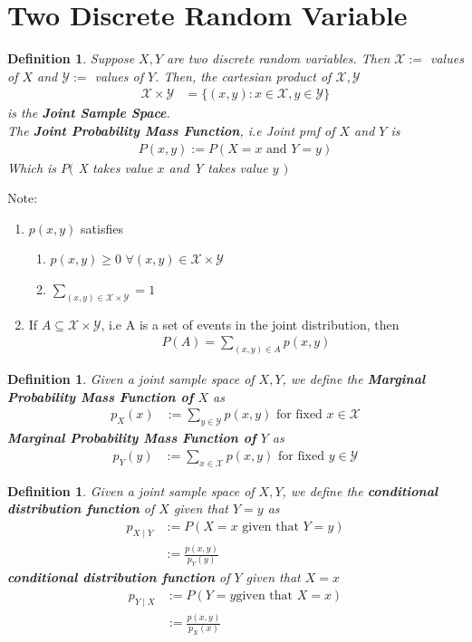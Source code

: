 \documentclass[11pt,oneside]{book}
\theoremstyle{newStyle}
\newtheorem{defn}[thm]{Definition}
\newcommand{\note}{\color{red}Note: \color{black}}
\begin{document}
\section[Two Discrete Random Variable]{Two Discrete Random Variable}
\begin{defn}
Suppose $X,Y$ are two discrete random variables. Then $\mathcal{X}:=$ values of $X$ and $\mathcal{Y}:=$ values of $Y$. Then, the cartesian product of $\mathcal{X},\mathcal{Y}$\begin{align*}
\mathcal{X}\times \mathcal{Y}&=\{(x,y):x\in \mathcal{X},y\in \mathcal{Y}\}
\end{align*}
is the \textbf{Joint Sample Space}.\\
The \textbf{Joint Probability Mass Function}, i.e Joint pmf of $X$ and $Y$ is \begin{align*}
P(x,y):=P(X=x \text{ and }Y=y)
\end{align*}
Which is $P($ X takes value $x$ and Y takes value $y$ $)$
\end{defn}
\note \begin{enumerate}
\item $p(x,y)$ satisfies \begin{enumerate}
\item $p(x,y)\geq 0$ $\forall(x,y)\in \mathcal{X}\times \mathcal{Y}$
\item $\sum_{(x,y)\in \mathcal{X}\times \mathcal{Y}}=1$
\end{enumerate}
\item If $A\subseteq \mathcal{X}\times \mathcal{Y}$, i.e A is a set of events in the joint distribution, then \begin{align*}
P(A)=\sum_{(x,y)\in A}p(x,y)
\end{align*}
\end{enumerate}
\begin{defn}
Given a joint sample space of $X,Y$, we define the \textbf{Marginal Probability Mass Function of }$X$ as \begin{align*}
p_X(x)&:=\sum_{y\in \mathcal{Y}}p(x,y) \text{ for fixed }x\in \mathcal{X}
\end{align*}
\textbf{Marginal Probability Mass Function of }$Y$ as \begin{align*}
p_Y(y)&:=\sum_{x\in \mathcal{X}}p(x,y) \text{ for fixed }y\in \mathcal{Y}
\end{align*}
\end{defn}
\begin{defn}
Given a joint sample space of $X,Y$, we define the \textbf{conditional distribution function} of $X$ given that $Y=y$ as \begin{align*}
p_{X\mid Y}&:=P(X=x \text{ given that }Y=y)\\
&:=\frac{p(x,y)}{p_Y(y)}
\end{align*}
 \textbf{conditional distribution function} of $Y$ given that $X=x$ \begin{align*}
p_{Y\mid X}&:=P(Y=y \text{given that }X=x)\\
&:=\frac{p(x,y)}{p_X(x)}
\end{align*}
\end{defn}
\end{document}
